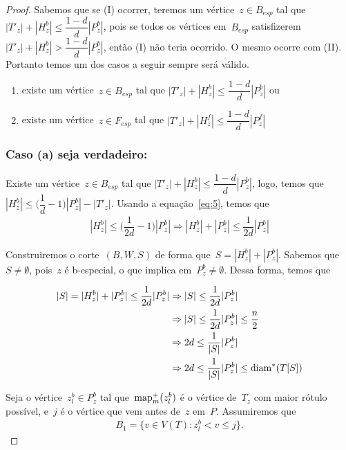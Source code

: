 \begin{proof}
	Sabemos que se (I) ocorrer, teremos um 
	vértice~${z\in B_{esp}}$ tal que~${|T'_z|+|H^b_z|\le \dfrac{1-d}{d}|P^b_z|}$,
	pois se todos os vértices em~$B_{esp}$ 
	satisfizerem~${|T'_z|+|H^b_z| > \dfrac{1-d}{d}|P^b_z|}$, então (I)
	não teria ocorrido.
	O mesmo ocorre com (II). 
	Portanto temos um dos casos
	a seguir sempre será válido.

	\begin{enumerate}[label=(\alph*)]
		\item existe um vértice~$z\in B_{esp}$ 
			tal que $|T'_{z}|+|H_z^b|\le
			\dfrac{1-d}{d}|P_z^b|$ ou
		\item existe um vértice~$z\in F_{esp}$ 
			tal que $|T'_{z}|+|H_z^f|\le
			\dfrac{1-d}{d}|P_z^f|$
	\end{enumerate}

	\bigskip
	\bigskip
	
	\subsubsection*{Caso (a) seja verdadeiro:}
		Existe um vértice~$z\in B_{esp}$ 
		tal que ${|T'_{z}|+|H_z^b|\le
		\dfrac{1-d}{d}|P_z^b|}$, logo, temos
		que~${|H^b_z|\le \Big(\dfrac{1}{d}-1\Big)|P^b_z|-|T'_z|}$.
		Usando a equação~\ref{eq:5}, temos 
		que
		\begin{align}
			|H^b_z|\le\Big(\dfrac{1}{2d}-1\Big)|P^b_z|
			\Rightarrow
			|H^b_z|+|P^b_z|\le\dfrac{1}{2d}|P^b_z| \nonumber
		\end{align}

		Construiremos o corte~$(B,W,S)$ de forma 
		que~$S = |H^b_z|+|P^b_z|$.
		Sabemos que~$S\ne \emptyset$, pois~$z$ é b-especial,
		o que implica em~$P^b_z\ne \emptyset$. 
		Dessa forma, temos que

		\begin{align}
			|S| = |H^b_z|+|P^b_z|\le\dfrac{1}{2d}|P^b_z|
			&\Rightarrow
			|S| \le\dfrac{1}{2d}|P^b_z| \nonumber \\
			&\Rightarrow
			|S| \le\dfrac{1}{2d}|P^b_z|\le \dfrac{n}{2} 
			\label{eq:metade} \\
			&\Rightarrow
			2d\le \dfrac{1}{|S|}|P^b_z|  
			\label{eq:reaproveitaCaminho}\\
			&\Rightarrow
			2d\le \dfrac{1}{|S|}|P^b_z|\le \mathrm{diam}^*(T[S]) 
			\nonumber
		\end{align}


		Seja o vértice~${z^b_l\in P^b_z}$ tal 
		que~$\mathrm{map}^+_m(z^b_l)$ é o vértice de~$T_z$ com 
		maior rótulo possível, e~$j$ é o vértice que vem
		antes de~$z$ em~$P$. Assumiremos que
		\begin{align}
			B_1 = \Big\{ v\in V(T):z^b_l<v\le j \Big\}
			\nonumber.
		\end{align}


\end{proof}
